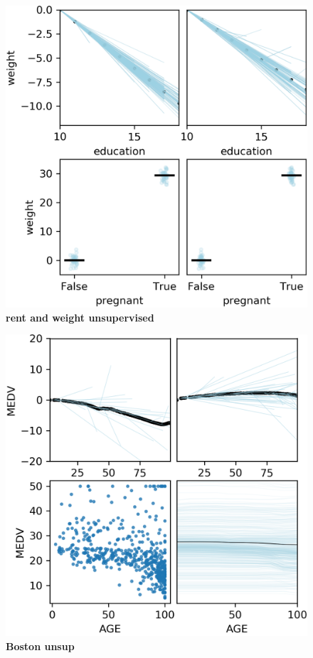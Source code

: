 \documentclass[12pt]{article}
\begin{document}
\begin{figure}[htbp]
\begin{center}
\includegraphics[scale=0.7]{images/weight_unsup.png}
\caption{{\bf  rent and weight unsupervised}}
\label{fig:rent_weight_unsup}
\end{center}
\end{figure}

\begin{figure}[htbp]
\begin{center}
\includegraphics[scale=0.7]{images/boston_unsup.png}
\caption{{\bf   Boston unsup}}
\label{fig:boston_unsup}
\end{center}
\end{figure}
\end{document}
